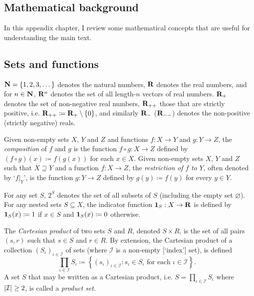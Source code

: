 \documentclass[11pt,letterpaper,reqno,oneside]{book}
\begin{document}
\begin{appendices}





\chapter{Mathematical background}
\label{math}

In this appendix chapter, I review some mathematical concepts that are useful for understanding the main text.



\section{Sets and functions}
\label{math:set}

$\mathbf{N} = \{1,2,3,\dots\}$ denotes the natural numbers, $\mathbf{R}$ denotes the real numbers, and for $n \in \mathbf{N}$, $\mathbf{R}^n$ denotes the set of all length-$n$ vectors of real numbers. $\mathbf{R}_+$ denotes the set of non-negative real numbers, $\mathbf{R}_{++}$ those that are strictly positive, i.e. $\mathbf{R}_{++} \coloneqq \mathbf{R}_+ \setminus \{0\}$, and similarly $\mathbf{R}_-$ ($\mathbf{R}_{--}$) denotes the non-positive (strictly negative) reals.

Given non-empty sets $X$, $Y$ and $Z$ and functions $f : X \to Y$ and $g : Y \to Z$, the \emph{composition} of $f$ and $g$ is the function $f \circ g : X \to Z$ defined by $(f \circ g)(x) \coloneqq f(g(x))$ for each $x \in X$. Given non-empty sets $X$, $Y$ and $Z$ such that $X \supseteq Y$ and a function $f : X \to Z$, the \emph{restriction of $f$ to $Y$,} often denoted by `$f|_Y$', is the function $g : Y \to Z$ defined by $g(y) \coloneqq f(y)$ for every $y \in Y$.

For any set $S$, $2^S$ denotes the set of all subsets of $S$ (including the empty set $\varnothing$). For any nested sets $S \subseteq X$, the indicator function $\boldsymbol{1}_S : X \to \mathbf{R}$ is defined by $\boldsymbol{1}_S(x) \coloneqq 1$ if $x \in S$ and $\boldsymbol{1}_S(x) \coloneqq 0$ otherwise.

The \emph{Cartesian product} of two sets $S$ and $R$, denoted $S \times R$, is the set of all pairs $(s,r)$ such that $s \in S$ and $r \in R$. By extension, the Cartesian product of a collection $(S_\iota)_{\iota \in \mathcal{I}}$ of sets (where $\mathcal{I}$ is a non-empty [`index'] set), is defined
%
\begin{equation*}
	\prod_{\iota \in \mathcal{I}} S_\iota
	\coloneqq \left\{
	(s_\iota)_{\iota \in \mathcal{I}} : 
	\text{$s_\iota \in S_\iota$ for each $\iota \in \mathcal{I}$}
	\right\} .
\end{equation*}
%
A set $S$ that may be written as a Cartesian product, i.e. $S = \prod_{\iota \in \mathcal{I}} S_\iota$ where $\abs*{\mathcal{I}} \geq 2$, is called a \emph{product set.}


\end{appendices}
\end{document}
